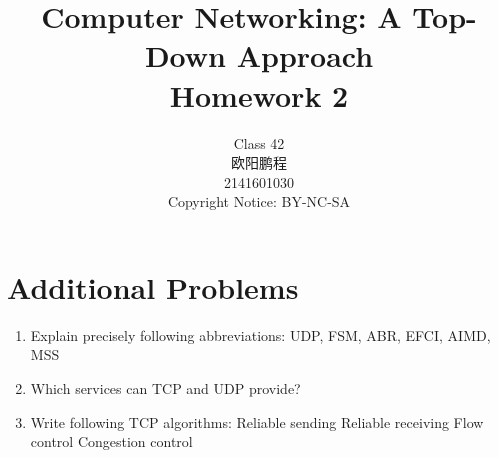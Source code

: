 \documentclass[]{article}
\title{Computer Networking: A Top-Down Approach \\ Homework 2}
\author{Class 42 \\ 欧阳鹏程 \\ 2141601030 \\ Copyright Notice: BY-NC-SA}
\begin{document}
\maketitle

\section{Additional Problems}
\begin{enumerate}
	\item Explain precisely following abbreviations:
	\subitem UDP, FSM, ABR, EFCI, AIMD, MSS
	
	\item Which services can TCP and UDP provide?
	
	\item Write following TCP algorithms:
	\subitem Reliable sending
	\subitem Reliable receiving
	\subitem Flow control
	\subitem Congestion control
\end{enumerate}
\end{document}
